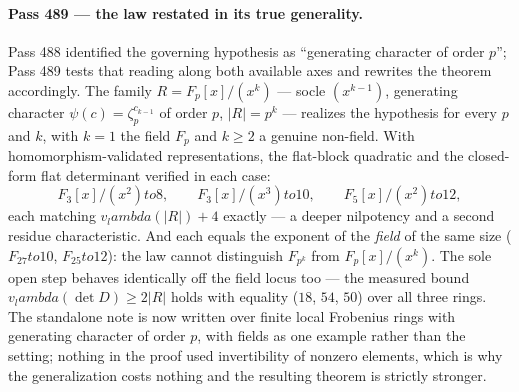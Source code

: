\documentclass[12pt,a4paper]{article}
\def\mathbb#1{#1}%
\def\textbf#1{#1}%
\def\lambda{lambda}%
\def\to{ to }%
\theoremstyle{definition}
\newcommand{\FF}{\mathbb{F}}
\begin{document}
\paragraph{Pass 489 --- the law restated in its true generality.}
Pass 488 identified the governing hypothesis as ``generating character of order
$p$''; Pass 489 tests that reading along both available axes and rewrites the
theorem accordingly.  The family $R=\FF_p[x]/(x^k)$ --- socle $(x^{k-1})$,
generating character $\psi(c)=\zeta_p^{c_{k-1}}$ of order $p$, $|R|=p^k$ ---
realizes the hypothesis for every $p$ and $k$, with $k=1$ the field $\FF_p$ and
$k\ge2$ a genuine non-field.  With homomorphism-validated representations, the
flat-block quadratic and the closed-form flat determinant verified in each
case:
\[
\FF_3[x]/(x^2)\to 8,\qquad \FF_3[x]/(x^3)\to 10,\qquad \FF_5[x]/(x^2)\to 12,
\]
each matching $v_\lambda(|R|)+4$ exactly --- a deeper nilpotency and a second
residue characteristic.  \textbf{And each equals the exponent of the
\emph{field} of the same size} ($\FF_{27}\to10$, $\FF_{25}\to12$): the law
cannot distinguish $\FF_{p^k}$ from $\FF_p[x]/(x^k)$.  The sole open step
behaves identically off the field locus too --- the measured bound
$v_\lambda(\det D)\ge2|R|$ holds with equality ($18$, $54$, $50$) over all
three rings.  The standalone note is now written over finite local Frobenius
rings with generating character of order $p$, with fields as one example rather
than the setting; nothing in the proof used invertibility of nonzero elements,
which is why the generalization costs nothing and the resulting theorem is
strictly stronger.
\end{document}
